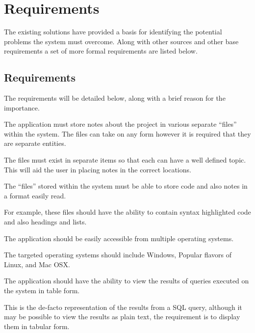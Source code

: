 \chapter{Requirements}\label{requirements}

The existing solutions have provided a basis for identifying the
potential problems the system must overcome. Along with other sources
and other base requirements a set of more formal requirements are listed
below.
\section{Requirements}

The requirements will be detailed below, along with a brief reason for the
importance.

\begin{requirement}
The application must store notes about the project in various separate
``files'' within the system. The files can take on any form however it is
required that they are separate entities.

The files must exist in separate items so that each can have a well defined
topic. This will aid the user in placing notes in the correct locations.
\end{requirement}

\begin{requirement}
The ``files'' stored within the system must be able to store code and also
notes in a format easily read.

For example, these files should have the ability to contain syntax highlighted
code and also headings and lists.
\end{requirement}

\begin{requirement}\label{requirement:accessible}
The application should be easily accessible from multiple operating systems.

The targeted operating systems should include Windows, Popular flavors of
Linux, and Mac OSX.
\end{requirement}

\begin{requirement}
The application should have the ability to view the results of queries executed
on the system in table form.

This is the de-facto representation of the results from a SQL query, although
it may be possible to view the results as plain text, the requirement is to
display them in tabular form.
\end{requirement}

